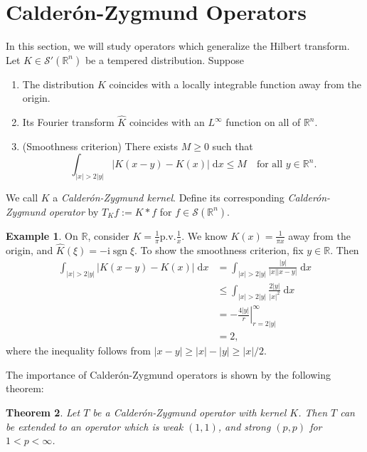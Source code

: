 \documentclass{book}
\newcommand{\scrS}{\mathscr{S}}
\newcommand{\bbR}{\mathbb{R}}
\renewcommand{\d}{\mathrm{d}}
\renewcommand{\i}{\mathrm{i}}
\newcommand{\abs}[1]{\left\lvert {#1} \right\rvert}
\DeclareMathOperator{\sgn}{sgn}
\newtheorem{theorem}{Theorem}[chapter]
\theoremstyle{definition}
\newtheorem{example}[theorem]{Example}
\theoremstyle{remark}
\numberwithin{equation}{chapter}
\begin{document}
\section{Calder\'on-Zygmund Operators}
In this section, we will study operators which generalize the Hilbert transform. Let $K \in \scrS'(\bbR^n)$ be a tempered distribution. Suppose
\begin{enumerate}[label=(\roman*)]
    \item The distribution $K$ coincides with a locally integrable function away from the origin.
    \item Its Fourier transform $\widehat{K}$ coincides with an $L^\infty$ function on all of $\bbR^n$.
    \item (Smoothness criterion) There exists $M \geq 0$ such that 
    \begin{equation}
        \int_{\abs{x} > 2\abs{y}} \abs{K(x-y) - K(x)} \; \d x \leq M \quad \text{for all } y \in \bbR^n.
    \end{equation}
\end{enumerate}
We call $K$ a \textit{Calder\'on-Zygmund kernel}. Define its corresponding \textit{Calder\'on-Zygmund operator} by $T_K f := K \ast f$ for $f \in \scrS(\bbR^n)$.
\begin{example}
    On $\bbR$, consider $K = \frac{1}{\pi}\text{p.v.} \frac{1}{x}$. We know $K(x) = \frac{1}{\pi x}$ away from the origin, and $\widehat{K}(\xi) = -\i \sgn{\xi}$. To show the smoothness criterion, fix $y \in \bbR$. Then 
    \begin{equation} \begin{aligned}
        \int_{\abs{x} > 2\abs{y}} \abs{K(x-y) - K(x)} \; \d x &= \int_{\abs{x} > 2\abs{y}} \frac{\abs{y}}{\abs{x}\abs{x-y}} \; \d x \\
                                                              &\leq \int_{\abs{x} > 2\abs{y}} \frac{2\abs{y}}{\abs{x}^2} \; \d x \\
                                                              &= \left. -\frac{4\abs{y}}{r} \right\vert_{r=2\abs{y}}^\infty \\ 
                                                              &= 2,
    \end{aligned} \end{equation}
    where the inequality follows from $\abs{x - y} \geq \abs{x} - \abs{y} \geq \abs{x}/2$.
\end{example}
The importance of Calder\'on-Zygmund operators is shown by the following theorem:
\begin{theorem} \label{thm:caldZyg}
    Let $T$ be a Calder\'on-Zygmund operator with kernel $K$. Then $T$ can be extended to an operator which is weak $(1,1)$, and strong $(p,p)$ for $1 < p < \infty$.
\end{theorem}
\end{document}
